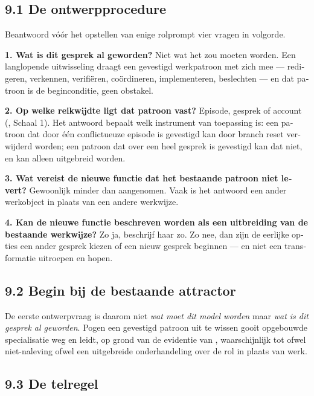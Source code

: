 \begin{dutch}
\subsection*{9.1 De ontwerpprocedure}
\label{sec:nl:9.1}

Beantwoord vóór het opstellen van enige rolprompt vier vragen in volgorde.

\textbf{1. Wat is dit gesprek al geworden?} Niet wat het zou moeten worden. Een langlopende uitwisseling draagt een gevestigd werkpatroon met zich mee — redigeren, verkennen, verifiëren, coördineren, implementeren, beslechten — en dat patroon is de beginconditie, geen obstakel.

\textbf{2. Op welke reikwijdte ligt dat patroon vast?} Episode, gesprek of account (, Schaal 1). Het antwoord bepaalt welk instrument van toepassing is: een patroon dat door één conflictueuze episode is gevestigd kan door branch reset verwijderd worden; een patroon dat over een heel gesprek is gevestigd kan dat niet, en kan alleen uitgebreid worden.

\textbf{3. Wat vereist de nieuwe functie dat het bestaande patroon niet levert?} Gewoonlijk minder dan aangenomen. Vaak is het antwoord een ander werkobject in plaats van een andere werkwijze.

\textbf{4. Kan de nieuwe functie beschreven worden als een uitbreiding van de bestaande werkwijze?} Zo ja, beschrijf haar zo. Zo nee, dan zijn de eerlijke opties een ander gesprek kiezen of een nieuw gesprek beginnen — en niet een transformatie uitroepen en hopen.


\subsection*{9.2 Begin bij de bestaande attractor}
\label{sec:nl:9.2}

De eerste ontwerpvraag is daarom niet \emph{wat moet dit model worden} maar \emph{wat is dit gesprek al geworden}. Pogen een gevestigd patroon uit te wissen gooit opgebouwde specialisatie weg en leidt, op grond van de evidentie van , waarschijnlijk tot ofwel niet-naleving ofwel een uitgebreide onderhandeling over de rol in plaats van werk.


\subsection*{9.3 De telregel}
\label{sec:nl:9.3}


\end{dutch}

